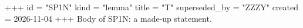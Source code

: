 +++
id = "SP1N"
kind = "lemma"
title = "T"
superseded_by = "ZZZY"
created = 2026-11-04
+++
Body of SP1N: a made-up statement.
